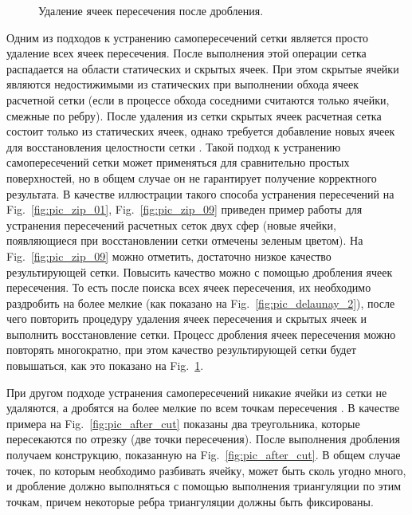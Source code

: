 \begin{figure}[h]
\begin{minipage}[h]{0.32\textwidth}
    \caption{Удаление ячеек пересечения после дробления.}\label{fig:pic_zip_15}
  \end{minipage}
\end{figure}

Одним из подходов к устранению самопересечений сетки является просто удаление всех ячеек пересечения.
После выполнения этой операции сетка распадается на области статических и скрытых ячеек.
При этом скрытые ячейки являются недостижимыми из статических при выполнении обхода ячеек расчетной сетки (если в процессе обхода соседними считаются только ячейки, смежные по ребру).
После удаления из сетки скрытых ячеек расчетная сетка состоит только из статических ячеек, однако требуется добавление новых ячеек для восстановления целостности сетки \cite{Charton}.
Такой подход к устранению самопересечений сетки может применяться для сравнительно простых поверхностей, но в общем случае он не гарантирует получение корректного результата.
В качестве иллюстрации такого способа устранения пересечений на Fig.~\ref{fig:pic_zip_01}, Fig.~\ref{fig:pic_zip_09} приведен пример работы для устранения пересечений расчетных сеток двух сфер (новые ячейки, появляющиеся при восстановлении сетки отмечены зеленым цветом).
На Fig.~\ref{fig:pic_zip_09} можно отметить, достаточно низкое качество результирующей сетки.
Повысить качество можно с помощью дробления ячеек пересечения.
То есть после поиска всех ячеек пересечения, их необходимо раздробить на более мелкие (как показано на Fig.~\ref{fig:pic_delaunay_2}), после чего повторить процедуру удаления ячеек пересечения и скрытых ячеек и выполнить восстановление сетки.
Процесс дробления ячеек пересечения можно повторять многократно, при этом качество результирующей сетки будет повышаться, как это показано на Fig.~\ref{fig:pic_zip_15}.

При другом подходе устранения самопересечений никакие ячейки из сетки не удаляются, а дробятся на более мелкие по всем точкам пересечения \cite{Skvorkovska}.
В качестве примера на Fig.~\ref{fig:pic_after_cut} показаны два треугольника, которые пересекаются по отрезку (две точки пересечения).
После выполнения дробления получаем конструкцию, показанную на Fig.~\ref{fig:pic_after_cut}.
В общем случае точек, по которым необходимо разбивать ячейку, может быть сколь угодно много, и дробление должно выполняться с помощью выполнения триангуляции по этим точкам, причем некоторые ребра триангуляции должны быть фиксированы.


